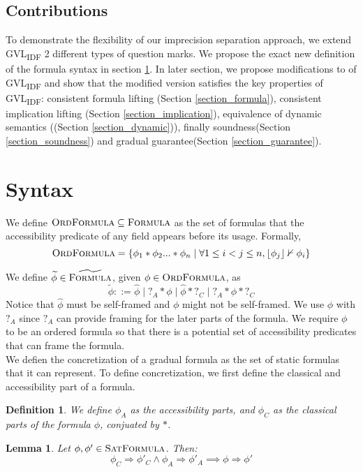 \documentclass {article}
\newtheorem{lemma}[theorem]{Lemma}
\newtheorem{definition}[theorem]{Definition}
\newcommand{\fphi}{\widehat{\phi}}
\newcommand{\tphi}{\widetilde{\phi}}
\newcommand{\satdef}{\textsc{SatFormula}}
\newcommand{\gradformula}{\widetilde{\textsc{Formula}}}
\begin{document}
\subsection{Contributions}
To demonstrate the flexibility of our imprecision separation approach, we extend GVL\textsubscript{IDF} 2 different types of question marks. We propose the exact new definition of the formula syntax in section \ref{section_syntax}. In later section, we propose modifications to of  GVL\textsubscript{IDF} and show that the modified version satisfies the key properties of GVL\textsubscript{IDF}: consistent formula lifting (Section \ref{section_formula}), consistent implication lifting (Section \ref{section_implication}), equivalence of dynamic semantics ((Section \ref{section_dynamic})), finally soundness(Section \ref{section_soundness}) and gradual guarantee(Section \ref{section_guarantee}).

\section{Syntax}
\label{section_syntax}
We define $\textsc{OrdFormula} \subseteq \textsc{Formula}$ as the set of formulas that the accessibility predicate of any field appears before its usage. Formally, 
$$\textsc{OrdFormula} = \{\phi_1 \ast \phi_2 ... \ast \phi_n \mid \forall 1 \leq i < j \leq n, \lfloor \phi_j \rfloor \nvdash \phi_i\}$$

We define $\tphi \in \gradformula$, given $\phi \in \textsc{OrdFormula}$, as
$$\tphi ::= \fphi \mid ?_A \ast \phi \mid \fphi \ast ?_C \mid  ?_A \ast \phi \ast ?_C$$
Notice that $\fphi$ must be self-framed and $\phi$ might not be self-framed. We use $\phi$ with $?_A$ since $?_A$ can provide framing for the later parts of the formula. We require $\phi$ to be an ordered formula so that there is a potential set of accessibility predicates that can frame the formula. \\

We defien the concretization of a gradual formula as the set of static formulas that it can represent. To define concretization, we first define the classical and accessibility part of a formula.
\begin{definition}
\label{def_AC}
We define $\phi_A$ as the accessibility parts, and $\phi_C$ as the classical parts of the formula $\phi$, conjuated by $\ast$.
\end{definition}

\begin{lemma}
\label{lemma_AC}
Let $\phi, \phi' \in \satdef$. Then:
$$\phi_C \Rightarrow \phi'_C \wedge \phi_A \Rightarrow \phi'_A \implies \phi \Rightarrow \phi'$$
\end{lemma}
\end{document}
